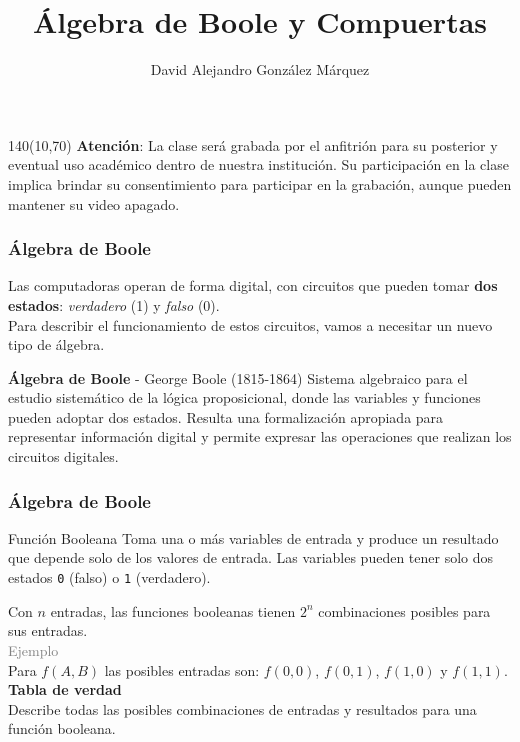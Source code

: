 \documentclass[aspectratio=169]{beamer}
\title{\Huge Álgebra de Boole y Compuertas}
\author{David Alejandro González Márquez}
\date{}
\begin{document}
\begin{frame}[plain]
    \titlepage
    \begin{textblock}{140}(10,70)
    \textcolor{rojo}{
    \textbf{Atención}: La clase será grabada por el anfitrión para su posterior y eventual uso académico dentro de nuestra institución. Su participación en la clase implica brindar su consentimiento para participar en la grabación, aunque pueden mantener su video apagado.}
    \end{textblock}
\end{frame}

\begin{frame}[fragile]
    \frametitle{Álgebra de Boole}
    Las computadoras operan de forma digital, con circuitos que pueden tomar \textbf{dos estados}: \textit{verdadero} (1) y \textit{falso} (0).\\
    \bigskip
    Para describir el funcionamiento de estos circuitos, vamos a necesitar un nuevo tipo de álgebra.\\
    \bigskip
    \pause
    \begin{block}{\textbf{Álgebra de Boole} {\small- George Boole (1815-1864)}}
    Sistema algebraico para el estudio sistemático de la lógica proposicional, 
    donde las variables y funciones pueden adoptar dos estados.
    Resulta una formalización apropiada para representar información digital y permite expresar las operaciones que realizan los circuitos digitales.
    \end{block}    
\end{frame}

\begin{frame}[fragile]
    \frametitle{Álgebra de Boole}
    \begin{block}{\small Función Booleana}
    Toma una o más variables de entrada y produce un resultado que depende solo de los valores de entrada.
    Las variables pueden tener solo dos estados \texttt{0} (falso) o \texttt{1} (verdadero).
    \end{block}
    \pause
    Con $n$ entradas, las funciones booleanas tienen $2^n$ combinaciones posibles para sus entradas.\\
    \bigskip
    \textcolor{gray}{Ejemplo}\\
    Para $f(A,B)$ las posibles entradas son: \texttt{$f(0,0)$}, \texttt{$f(0,1)$}, \texttt{$f(1,0)$} y \texttt{$f(1,1)$}.\\
    \bigskip
    \textbf{Tabla de verdad}\\ Describe todas las posibles combinaciones de entradas y resultados para una función booleana.
\end{frame}
\end{document}

